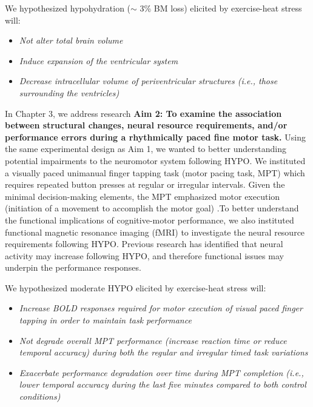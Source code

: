 We hypothesized hypohydration (${\sim}$ 3\% BM loss) elicited by exercise-heat stress will:
	\begin{itemize}
		\item \textit{Not alter total brain volume}
		\item \textit{Induce expansion of the ventricular system}
		\item \textit{Decrease intracellular volume of periventricular structures (i.e., those surrounding the ventricles)} 
	\end{itemize}

In Chapter 3, we address research \textbf{Aim 2: To examine the association between structural changes, neural resource requirements, and/or performance errors during a rhythmically paced fine motor task.} Using the same experimental design as Aim 1, we wanted to better understanding potential impairments to the neuromotor system following HYPO. We instituted a visually paced unimanual finger tapping task (motor pacing task, MPT) which requires repeated button presses at regular or irregular intervals. Given the minimal decision-making elements, the MPT emphasized motor execution (initiation of a movement to accomplish the motor goal) \cite{kaufman_roles_2013}.To better understand the functional implications of cognitive-motor performance, we also instituted functional magnetic resonance imaging (fMRI) to investigate the neural resource requirements following HYPO. Previous research has identified that neural activity may increase \cite{kempton_dehydration_2011,watson_mild_2015} following HYPO, and therefore functional issues may underpin the performance responses. 

We hypothesized moderate HYPO elicited by exercise-heat stress will:

\begin{itemize}
	\item \textit{Increase BOLD responses required for motor execution of visual paced finger tapping in order to maintain task performance}
	\item \textit{Not degrade overall MPT performance (increase reaction time or reduce temporal accuracy) during both the regular and irregular timed task variations}
	\item \textit{Exacerbate performance degradation over time during MPT completion (i.e., lower temporal accuracy during the last five minutes compared to both control conditions)}
\end{itemize}

